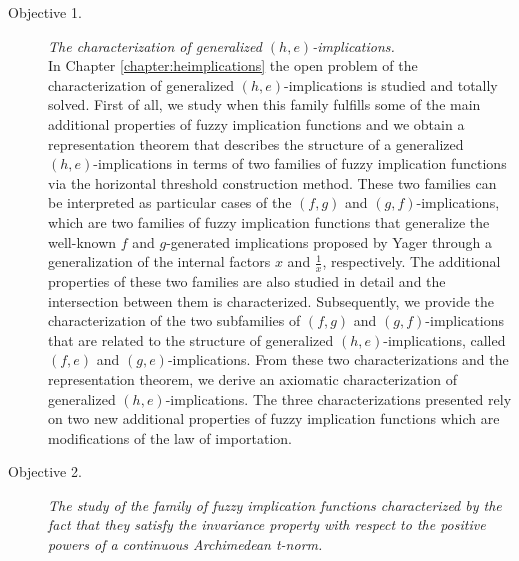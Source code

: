 \begin{description}
	\item[Objective 1.] \textit{The characterization of generalized $(h,e)$-implications.}\\
	In Chapter \ref{chapter:heimplications} the open problem of the characterization of generalized $(h,e)$-im\-pli\-ca\-tions \cite{Massanet2011A} is studied and totally solved. First of all, we study when this family fulfills some of the main additional properties of fuzzy implication functions and we obtain a representation theorem that describes the structure of a generalized $(h,e)$-implications in terms of two families of fuzzy implication functions via the horizontal threshold construction method. These two families can be interpreted as particular cases of the $(f,g)$ and $(g,f)$-implications, which are two families of fuzzy implication functions that generalize the well-known $f$ and $g$-generated implications proposed by Yager \cite{Yager2004} through a generalization of the internal factors $x$ and $\frac{1}{x}$, respectively. The additional properties of these two families are also studied in detail and the intersection between them is characterized. Subsequently, we provide the characterization of the two subfamilies of $(f,g)$ and $(g,f)$-implications that are related to the structure of generalized $(h,e)$-implications, called $(f,e)$ and $(g,e)$-implications. From these two characterizations and the representation theorem, we derive an axiomatic characterization of generalized $(h,e)$-implications. The three characterizations presented rely on two new additional properties of fuzzy implication functions which are modifications of the law of importation.
	
	\item[Objective 2.] \textit{The study of the family of fuzzy implication functions characterized by the fact that they satisfy the invariance property with respect to the positive powers of a continuous Archimedean t-norm.}
	

\end{description}

